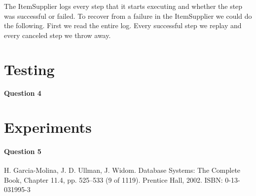 \documentclass[a4paper, 11pt]{article}
\begin{document}
The ItemSupplier logs every step that it starts executing and whether the step was successful or failed. To recover from a failure in the ItemSupplier we could do the following. First we read the entire log. Every successful step we replay and every canceled step we throw away.


\section{Testing} %
\label{sec:testing}

\paragraph{Question 4} %
\label{par:question_4}



\section{Experiments} %
\label{sec:experiments}

\paragraph{Question 5} %
\label{par:question_5}




\begin{thebibliography}{9}

    H. Garcia-Molina, J. D. Ullman, J. Widom.
    Database Systems: The Complete Book,
    Chapter 11.4, pp. 525–533 (9 of 1119).
    Prentice Hall, 2002.
    ISBN: 0-13-031995-3
\end{thebibliography}
\end{document}
